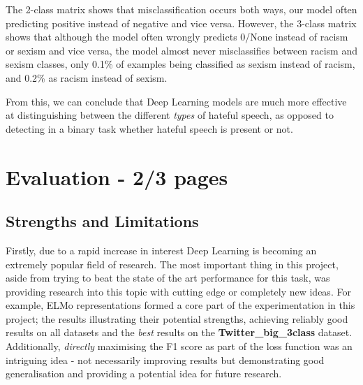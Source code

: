 \documentclass[12pt,a4paper]{article}
\begin{document}
The 2-class matrix shows that misclassification occurs both ways, our model often predicting positive instead of negative and vice versa. However, the 3-class matrix shows that although the model often wrongly predicts 0/None instead of racism or sexism and vice versa, the model almost never misclassifies between racism and sexism classes, only 0.1\% of examples being classified as sexism instead of racism, and 0.2\% as racism instead of sexism.

From this, we can conclude that Deep Learning models are much more effective at distinguishing between the different \textit{types} of hateful speech, as opposed to detecting in a binary task whether hateful speech is present or not.


\section{Evaluation - 2/3 pages}

\subsection{Strengths and Limitations}
Firstly, due to a rapid increase in interest Deep Learning is becoming an extremely popular field of research. The most important thing in this project, aside from trying to beat the state of the art performance for this task, was providing research into this topic with cutting edge or completely new ideas. For example, ELMo representations formed a core part of the experimentation in this project; the results illustrating their potential strengths, achieving reliably good results on all datasets and the \textit{best} results on the \textbf{Twitter\_big\_3class} dataset. Additionally, \textit{directly} maximising the F1 score as part of the loss function was an intriguing idea - not necessarily improving results but demonstrating good generalisation and providing a potential idea for future research.
\end{document}
